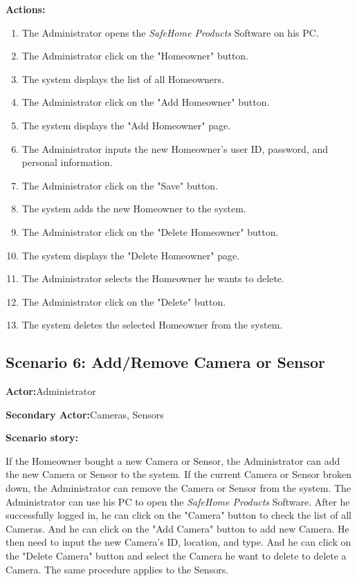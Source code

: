 \documentclass[twoside,11pt]{article}
\begin{document}
\textbf{Actions:}
\begin{enumerate}
    \item The Administrator opens the \emph{SafeHome Products} Software on his PC.
    \item The Administrator click on the "Homeowner" button.
    \item The system displays the list of all Homeowners.
    \item The Administrator click on the "Add Homeowner" button.
    \item The system displays the "Add Homeowner" page.
    \item The Administrator inputs the new Homeowner's user ID, password, and personal information.
    \item The Administrator click on the "Save" button.
    \item The system adds the new Homeowner to the system.
    \item The Administrator click on the "Delete Homeowner" button.
    \item The system displays the "Delete Homeowner" page.
    \item The Administrator selects the Homeowner he wants to delete.
    \item The Administrator click on the "Delete" button.
    \item The system deletes the selected Homeowner from the system.
\end{enumerate}


\subsection{Scenario 6: Add/Remove Camera or Sensor}

\textbf{Actor:}Administrator

\textbf{Secondary Actor:}Cameras, Sensors

\textbf{Scenario story:}

If the Homeowner bought a new Camera or Sensor, the Administrator can add the new Camera or Sensor to the system. If the current Camera or Sensor broken down, the Administrator can remove the Camera or Sensor from the system. The Administrator can use his PC to open the \emph{SafeHome Products} Software. After he successfully logged in, he can click on the "Camera" button to check the list of all Cameras. And he can click on the "Add Camera" button to add new Camera. He then need to input the new Camera's ID, location, and type. And he can click on the "Delete Camera" button and select the Camera he want to delete to delete a Camera. The same procedure applies to the Sensors.
\end{document}
